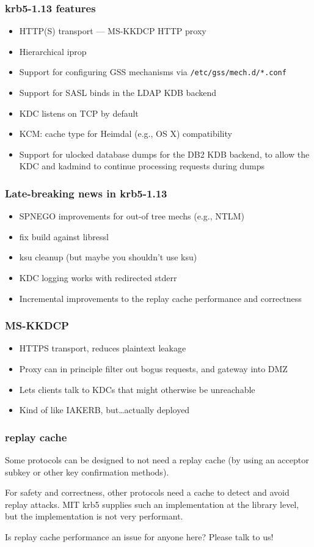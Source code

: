 \documentclass{beamer}
\begin{document}
\begin{frame}[fragile]
\frametitle{krb5-1.13 features}
\begin{itemize}
\item{HTTP(S) transport --- MS-KKDCP HTTP proxy}
\item{Hierarchical iprop}
\item{Support for configuring GSS mechanisms via \verb+/etc/gss/mech.d/*.conf+}
\item{Support for SASL binds in the LDAP KDB backend}
\item{KDC listens on TCP by default}
\item{KCM: cache type for Heimdal (e.g., OS X) compatibility}
\item{Support for ulocked database dumps for the DB2 KDB backend, to allow
	the KDC and kadmind to continue processing requests during dumps}
\end{itemize}
\end{frame}

\begin{frame}
\frametitle{Late-breaking news in krb5-1.13}
\begin{itemize}
\item{SPNEGO improvements for out-of tree mechs (e.g., NTLM)}
\item{fix build against libressl}
\item{ksu cleanup (but maybe you shouldn't use ksu)}
\item{KDC logging works with redirected stderr}
\item{Incremental improvements to the replay cache performance and
	correctness}
\end{itemize}
\end{frame}

\begin{frame}
\frametitle{MS-KKDCP}
\begin{itemize}
\item{HTTPS transport, reduces plaintext leakage}
\item{Proxy can in principle filter out bogus requests, and gateway into DMZ}
\item{Lets clients talk to KDCs that might otherwise be unreachable}
\item{Kind of like IAKERB, but\ldots{}actually deployed}
\end{itemize}
\end{frame}

\begin{frame}
\frametitle{replay cache}
Some protocols can be designed to not need a replay cache (by using
an acceptor subkey or other key confirmation methods).

\vspace{1em}
For safety and correctness, other protocols need a cache to detect and
avoid replay attacks.  MIT krb5 supplies such an implementation at the
library level, but the implementation is not very performant.

\vspace{1em}
Is replay cache performance an issue for anyone here?  Please talk to us!
\end{frame}
\end{document}
